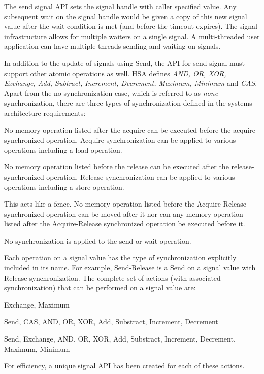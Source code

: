\documentclass{book}
\begin{document}


The send signal API sets the signal handle with caller specified
value. Any subsequent wait on the signal handle would be given
a copy of this new signal value after the wait condition
is met (and before the timeout expires).  The signal infrastructure
allows for multiple waiters on a single signal. A multi-threaded
user application can have multiple threads sending and waiting on
signals.

In addition to the update of signals using
Send, the API for send signal must support other atomic operations as
well. HSA defines \emph {AND, OR, XOR, Exchange, Add, Subtract,
Increment, Decrement, Maximum, Minimum} and \emph{CAS}. Apart from
the no synchronization case, which is referred to as \emph{none}
synchronization, there are three types of synchronization defined in
the systems architecture requirements:

\begin{description}[font=\it, leftmargin=1.5em]
\item[Acquire synchronization]
  No memory operation listed after the acquire can be
  executed before the acquire-synchronized operation. Acquire
  synchronization can be applied to various operations
  including a load operation.
\item[Release synchronization]
  No memory operation listed before the release can be
  executed after the release-synchronized operation. Release
  synchronization can be applied to various operations
  including a store operation.
\item[Acquire-Release synchronization]
  This acts like a fence. No memory operation listed
  before the Acquire-Release synchronized operation
  can be moved after it nor can any memory operation
  listed after the Acquire-Release synchronized
  operation be executed before it.
\item[Relaxed synchronization]
  No synchronization is applied to the send or wait
  operation.
\end{description}

Each operation on a signal value has the type of synchronization
explicitly included in its name. For example, Send-Release is a Send
on a signal value with Release synchronization. The complete set of
actions (with associated synchronization) that can be performed on a
signal value are:
\begin{description}[font=\it, leftmargin=1.5em]
\item[Acquire-Release synchronization] Exchange, Maximum
\item[Release synchronization] Send, CAS, AND, OR, XOR, Add, Substract, Increment, Decrement
\item[Relaxed synchronization] Send, Exchange, AND, OR, XOR, Add, Substract, Increment, Decrement, Maximum, Minimum
\end{description}
For efficiency, a unique signal API has been created for each of
these actions.
\end{document}
